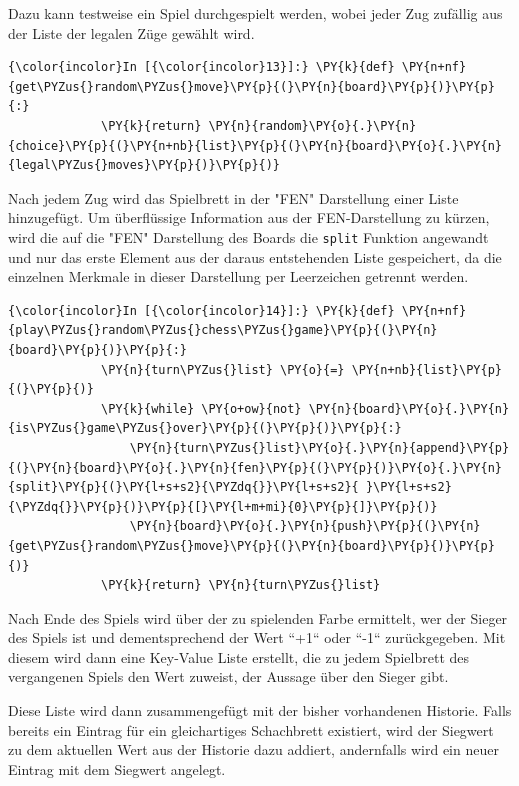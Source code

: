     Dazu kann testweise ein Spiel durchgespielt werden, wobei jeder Zug
zufällig aus der Liste der legalen Züge gewählt wird.

    \begin{Verbatim}[commandchars=\\\{\}]
{\color{incolor}In [{\color{incolor}13}]:} \PY{k}{def} \PY{n+nf}{get\PYZus{}random\PYZus{}move}\PY{p}{(}\PY{n}{board}\PY{p}{)}\PY{p}{:}
             \PY{k}{return} \PY{n}{random}\PY{o}{.}\PY{n}{choice}\PY{p}{(}\PY{n+nb}{list}\PY{p}{(}\PY{n}{board}\PY{o}{.}\PY{n}{legal\PYZus{}moves}\PY{p}{)}\PY{p}{)}
\end{Verbatim}
Nach jedem Zug wird das Spielbrett in der "FEN" Darstellung einer Liste hinzugefügt. Um überflüssige Information aus der FEN-Darstellung zu kürzen, wird die auf die "FEN" Darstellung des Boards die
\texttt{split} Funktion angewandt und nur das erste Element aus der
daraus entstehenden Liste gespeichert, da die einzelnen Merkmale in
dieser Darstellung per Leerzeichen getrennt werden.

    \begin{Verbatim}[commandchars=\\\{\}]
{\color{incolor}In [{\color{incolor}14}]:} \PY{k}{def} \PY{n+nf}{play\PYZus{}random\PYZus{}chess\PYZus{}game}\PY{p}{(}\PY{n}{board}\PY{p}{)}\PY{p}{:}
             \PY{n}{turn\PYZus{}list} \PY{o}{=} \PY{n+nb}{list}\PY{p}{(}\PY{p}{)}
             \PY{k}{while} \PY{o+ow}{not} \PY{n}{board}\PY{o}{.}\PY{n}{is\PYZus{}game\PYZus{}over}\PY{p}{(}\PY{p}{)}\PY{p}{:}
                 \PY{n}{turn\PYZus{}list}\PY{o}{.}\PY{n}{append}\PY{p}{(}\PY{n}{board}\PY{o}{.}\PY{n}{fen}\PY{p}{(}\PY{p}{)}\PY{o}{.}\PY{n}{split}\PY{p}{(}\PY{l+s+s2}{\PYZdq{}}\PY{l+s+s2}{ }\PY{l+s+s2}{\PYZdq{}}\PY{p}{)}\PY{p}{[}\PY{l+m+mi}{0}\PY{p}{]}\PY{p}{)}
                 \PY{n}{board}\PY{o}{.}\PY{n}{push}\PY{p}{(}\PY{n}{get\PYZus{}random\PYZus{}move}\PY{p}{(}\PY{n}{board}\PY{p}{)}\PY{p}{)}
             \PY{k}{return} \PY{n}{turn\PYZus{}list}
\end{Verbatim}


    Nach Ende des Spiels wird über der zu spielenden Farbe ermittelt, wer
der Sieger des Spiels ist und dementsprechend der Wert ``+1`` oder ``-1``
zurückgegeben. Mit diesem wird dann eine Key-Value Liste erstellt, die
zu jedem Spielbrett des vergangenen Spiels den Wert zuweist, der Aussage
über den Sieger gibt.

Diese Liste wird dann zusammengefügt mit der bisher vorhandenen
Historie. Falls bereits ein Eintrag für ein gleichartiges Schachbrett
existiert, wird der Siegwert zu dem aktuellen Wert aus der Historie dazu
addiert, andernfalls wird ein neuer Eintrag mit dem Siegwert angelegt.

